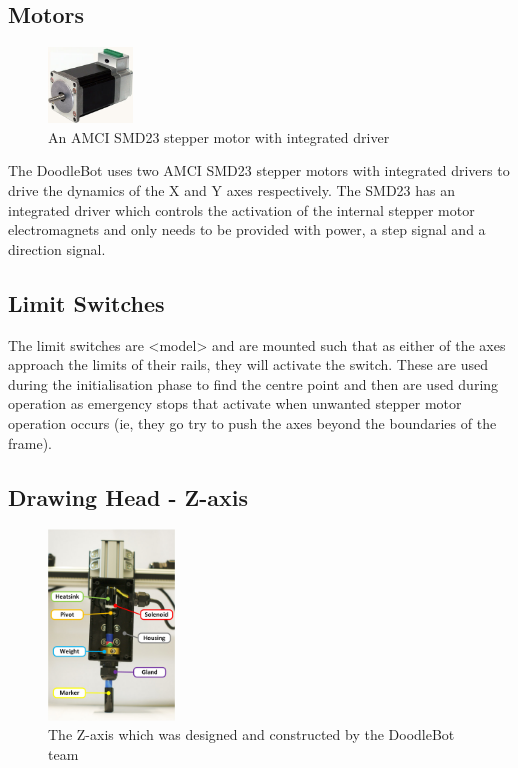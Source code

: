 \subsection{Motors}
	\begin{figure}[h]
		\centering
		\includegraphics[width=0.2\textwidth]{figures/cncMachine/amci-smd23.jpg}
		\caption{An AMCI SMD23 stepper motor with integrated driver}
	\end{figure}
	
	The DoodleBot uses two AMCI SMD23 stepper motors with integrated drivers to drive the dynamics of the X and Y axes respectively. The SMD23 has an integrated driver which controls the activation of the internal stepper motor electromagnets and only needs to be provided with power, a step signal and a direction signal.
\subsection{Limit Switches}
	The limit switches are <model> and are mounted such that as either of the axes approach the limits of their rails, they will activate the switch. These are used during the initialisation phase to find the centre point and then are used during operation as emergency stops that activate when unwanted stepper motor operation occurs (ie, they go try to push the axes beyond the boundaries of the frame).
\subsection{Drawing Head - Z-axis}
	\begin{figure}[h]
		\centering
		\includegraphics[width=0.3\textwidth]{figures/cncMachine/Z_axis.jpg}
		\caption{The Z-axis which was designed and constructed by the DoodleBot team}
	\end{figure}

